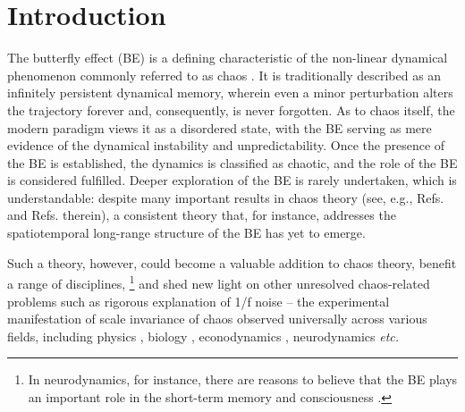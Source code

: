 \documentclass[final,5p,10pt,times,twocolumn,year]{elsarticle}
\begin{document}
\section{Introduction}
The butterfly effect (BE) is a defining characteristic of the non-linear dynamical phenomenon commonly referred to as chaos \cite{Mot14,Rue14,Poincare_celestial_dynamics,ButterFly}. It is traditionally described as an infinitely persistent dynamical memory, wherein even a minor perturbation alters the trajectory forever and, consequently, is never forgotten. As to chaos itself, the modern paradigm views it as a disordered state, with the BE serving as mere evidence of the dynamical instability and unpredictability. Once the presence of the BE is established, the dynamics is classified as chaotic, and the role of the BE is considered fulfilled. Deeper exploration of the BE is rarely undertaken, which is understandable: despite many important results in chaos theory (see, e.g., Refs. \cite{Gil98,Gilmore_book,RevModPhys.57.617,Chaos_book_1,Chaos_book_2017,10.1063/5.0025924,Yorke_1975,TransientChaos2015,Intermittency_Review,Baxendale.10.1007/BFb0076851,Arnold.10.1007/BFb0076835} and Refs. therein), a consistent theory that, for instance, addresses the spatiotemporal long-range structure of the BE has yet to emerge. 

Such a theory, however, could become a valuable addition to chaos theory, benefit a range of disciplines,%
\footnote{In neurodynamics, for instance, there are reasons to believe that the BE plays an important role in the short-term memory and consciousness \cite{ovchinnikov2020}.}
and shed new light on other unresolved chaos-related problems such as rigorous explanation of 1/f noise -- the experimental manifestation of scale invariance of chaos observed universally across various fields, including physics \cite{Voss_1979,RevModPhys.53.497,Keshner_1_f_noise_1982,Wang_1fnoise}, biology \cite{pinkNoiseBiosystems2001,EEG,Biology1fNoise,BookHeartBrainNoise}, econodynamics \cite{Pre11}, neurodynamics \cite{PhysRevLett.97.118102} \emph{etc.}
\end{document}
